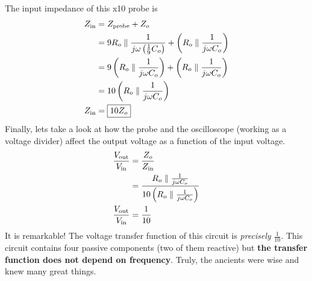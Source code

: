 The input impedance of this x10 probe is
\begin{align*}
    Z_{\text{in}} &= Z_{\text{probe}} + Z_o \\
    &= 9 R_o \parallel \frac{1}{ j\omega \left( \frac{1}{9} C_o \right) } + \left( R_o \parallel \frac{1}{ j\omega C_o } \right) \\
    &= 9 \left( R_o \parallel \frac{1}{ j\omega C_o } \right) + \left( R_o \parallel \frac{1}{ j\omega C_o } \right) \\ 
    &= 10 \left( R_o \parallel \frac{1}{ j\omega C_o } \right) \\
    Z_{\text{in}} &= \boxed{ 10 Z_o }
\end{align*}
Finally, lets take a look at how the probe and the oscilloscope (working as a voltage divider) affect the output voltage as a function of the input voltage.
\begin{align*}
    \frac{V_{\text{out}}}{V_{\text{in}}} &= \frac{Z_o}{Z_{\text{in}}} \\
    &= \frac{ R_o \parallel \frac{1}{ j\omega C_o } }{ 10 \left( R_o \parallel \frac{1}{ j\omega C_o } \right) } \\
    \frac{V_{\text{out}}}{V_{\text{in}}} &= \frac{1}{10}
\end{align*}
It is remarkable! The voltage transfer function of this circuit is \textit{precisely} $\frac{1}{10}$.  This circuit contains four passive components (two of them reactive) but \textbf{the transfer function does not depend on frequency}. Truly, the ancients were wise and knew many great things.

